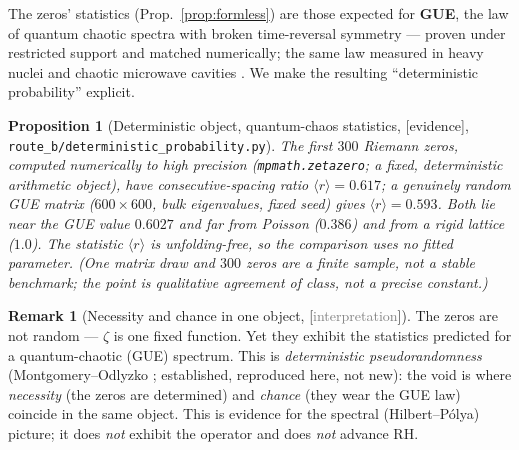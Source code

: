 \documentclass[11pt,a4paper]{article}
\newtheorem{proposition}[theorem]{Proposition}
\theoremstyle{definition}
\newtheorem{remark}[theorem]{Remark}
\newcommand{\TAGev}{{\small\textsf{[\textcolor{orange!80!black}{evidence}]}}}
\newcommand{\TAGphil}{{\small\textsf{[\textcolor{gray}{interpretation}]}}}
\begin{document}
The zeros' statistics (Prop.\ \ref{prop:formless}) are those expected for
\textbf{GUE}, the law of quantum chaotic spectra with broken time-reversal
symmetry --- proven under restricted support and matched numerically; the same
law measured in heavy nuclei \cite{Wigner} and chaotic microwave cavities
\cite{Stockmann}. We make the resulting ``deterministic probability'' explicit.

\begin{proposition}[Deterministic object, quantum-chaos statistics, \TAGev,
\texttt{route\_b/deterministic\_probability.py}]\label{prop:detprob}
The first $300$ Riemann zeros, computed numerically to high precision
(\texttt{mpmath.zetazero}; a fixed, deterministic arithmetic object), have
consecutive-spacing ratio $\langle r\rangle=0.617$; a \emph{genuinely random}
GUE matrix ($600{\times}600$, bulk eigenvalues, fixed seed) gives $\langle
r\rangle=0.593$. Both lie near the GUE value $0.6027$ and far from Poisson
($0.386$) and from a rigid lattice ($1.0$). The statistic $\langle r\rangle$
is unfolding-free, so the comparison uses \emph{no} fitted parameter. (One
matrix draw and $300$ zeros are a finite sample, not a stable benchmark; the
point is qualitative agreement of class, not a precise constant.)
\end{proposition}

\begin{remark}[Necessity and chance in one object, \TAGphil]
The zeros are not random --- $\zeta$ is one fixed function. Yet they exhibit
the statistics predicted for a quantum-chaotic (GUE) spectrum. This is
\emph{deterministic pseudorandomness} (Montgomery--Odlyzko \cite{Odlyzko};
established, reproduced here, not new): the void is where \emph{necessity}
(the zeros are determined) and \emph{chance} (they wear the GUE law) coincide
in the same object. This is evidence for the spectral (Hilbert--Pólya)
picture; it does \emph{not} exhibit the operator and does \emph{not} advance
RH.
\end{remark}
\end{document}
